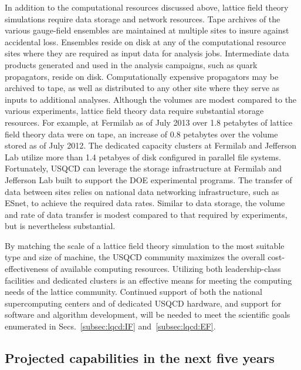 In addition to the computational resources discussed above, lattice field
theory simulations require data storage and network resources.  Tape archives
of the various gauge-field ensembles are maintained at multiple sites to
insure against accidental loss.  Ensembles reside on disk at any of the
computational resource sites where they are required as input data for
analysis jobs.  Intermediate data products generated and used in the analysis
campaigns, such as quark propagators, reside on disk.  Computationally
expensive propagators may be archived to tape, as well as distributed to any
other site where they serve as inputs to additional analyses.  Although the
volumes are modest compared to the various experiments, lattice field theory
data require substantial storage resources.  For example, at Fermilab as of
July 2013 over 1.8 petabytes of lattice field theory data were on tape, an
increase of 0.8 petabytes over the volume stored as of July 2012.  The
dedicated capacity clusters at Fermilab and Jefferson Lab utilize more than
1.4 petabyes of disk configured in parallel file systems.  Fortunately, USQCD
can leverage the storage infrastructure at Fermilab and Jefferson Lab built to
support the DOE experimental programs.  The transfer of data between sites
relies on national data networking infrastructure, such as ESnet, to achieve
the required data rates.  Similar to data storage, the volume and rate of data
transfer is modest compared to that required by experiments, but is
nevertheless substantial.

By matching the scale of a lattice field theory simulation to the most
suitable type and size of machine, the USQCD community maximizes the overall
cost-effectiveness of available computing resources.  Utilizing both
leadership-class facilities and dedicated clusters is an effective means for
meeting the computing needs of the lattice community.  Continued support of
both the national supercomputing centers and of dedicated USQCD hardware, and
support for software and algorithm development, will be needed to meet the
scientific goals enumerated in Secs.~\ref{subsec:lqcd:IF}
and~\ref{subsec:lqcd:EF}.

\subsection{Projected capabilities in the next five years}
\label{subsec:lqcd:fiveyear}

